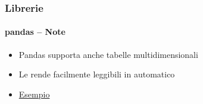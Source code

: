 \begin{exampleframe}
    \frametitle{Librerie}
    \framesubtitle{pandas -- Note}

    \begin{itemize}
        \item Pandas supporta anche tabelle multidimensionali
        \item Le rende facilmente leggibili in automatico

        \bigskip
        \item \href{https://chatgpt.com/share/67ca152f-ff08-8003-ab7a-ade375e83d4e}{Esempio}
    \end{itemize}
\end{exampleframe}
